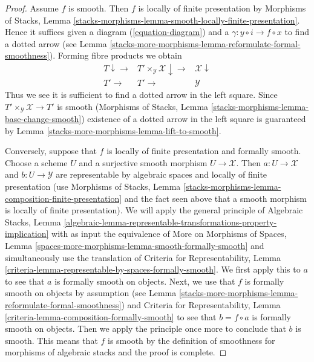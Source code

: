 \begin{proof}
Assume $f$ is smooth. Then $f$ is locally of finite presentation by
Morphisms of Stacks, Lemma
\ref{stacks-morphisms-lemma-smooth-locally-finite-presentation}.
Hence it suffices given a diagram (\ref{equation-diagram})
and a $\gamma : y \circ i \to f \circ x$ to find a dotted
arrow (see Lemma \ref{stacks-more-morphisms-lemma-reformulate-formal-smoothness}).
Forming fibre products we obtain
$$
\begin{array}{ccc}T \downarrow\longrightarrow & T' \times_\mathcal{Y} \mathcal{X} \downarrow\longrightarrow & \mathcal{X} \downarrow \\ T' \longrightarrow & T' \longrightarrow & \mathcal{Y}\end{array}
$$
Thus we see it is sufficient to find a dotted arrow in the
left square. Since $T' \times_\mathcal{Y} \mathcal{X} \to T'$
is smooth
(Morphisms of Stacks, Lemma \ref{stacks-morphisms-lemma-base-change-smooth})
existence of a dotted arrow in the left square is guaranteed by
Lemma \ref{stacks-more-morphisms-lemma-lift-to-smooth}.

\medskip\noindent
Conversely, suppose that $f$ is locally of finite presentation and
formally smooth. Choose a scheme $U$ and a surjective smooth morphism
$U \to \mathcal{X}$. Then $a : U \to \mathcal{X}$ and $b : U \to \mathcal{Y}$
are representable by algebraic spaces and locally of finite presentation
(use Morphisms of Stacks, Lemma
\ref{stacks-morphisms-lemma-composition-finite-presentation}
and the fact seen above
that a smooth morphism is locally of finite presentation).
We will apply the general principle of
Algebraic Stacks, Lemma
\ref{algebraic-lemma-representable-transformations-property-implication}
with as input the equivalence of More on Morphisms of Spaces,
Lemma \ref{spaces-more-morphisms-lemma-smooth-formally-smooth}
and simultaneously use the translation of
Criteria for Representability, Lemma
\ref{criteria-lemma-representable-by-spaces-formally-smooth}.
We first apply this to $a$ to see that $a$ is
formally smooth on objects. Next, we use that $f$ is
formally smooth on objects by assumption
(see Lemma \ref{stacks-more-morphisms-lemma-reformulate-formal-smoothness})
and Criteria for Representability, Lemma
\ref{criteria-lemma-composition-formally-smooth}
to see that $b = f \circ a$ is formally smooth on objects.
Then we apply the principle once more to conclude that $b$ is smooth.
This means that $f$ is smooth by the definition of smoothness
for morphisms of algebraic stacks and the proof is complete.
\end{proof}


